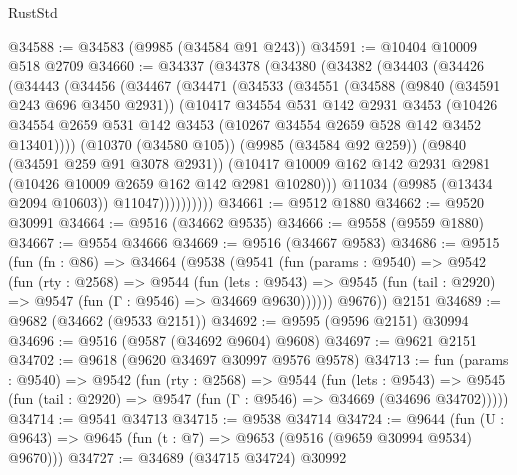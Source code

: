 \begin{lexlean}{RustStd}
\begin{coremodule}
@34588 := @34583 (@9985 (@34584 @91 @243))
@34591 := @10404 @10009 @518 @2709
@34660 := @34337
    (@34378
      (@34380
        (@34382
          (@34403
            (@34426
              (@34443
                (@34456
                  (@34467
                    (@34471
                      (@34533
                        (@34551
                          (@34588
                            (@9840 (@34591 @243 @696 @3450 @2931))
                            (@10417
                              @34554
                              @531
                              @142
                              @2931
                              @3453
                              (@10426
                                @34554
                                @2659
                                @531
                                @142
                                @3453
                                (@10267 @34554 @2659 @528 @142 @3452 @13401))))
                          (@10370 (@34580 @105))
                          (@9985 (@34584 @92 @259))
                          (@9840 (@34591 @259 @91 @3078 @2931))
                          (@10417
                            @10009
                            @162
                            @142
                            @2931
                            @2981
                            (@10426 @10009 @2659 @162 @142 @2981 @10280)))
                        @11034
                        (@9985 (@13434 @2094 @10603))
                        @11047))))))))))
@34661 := @9512 @1880
@34662 := @9520 @30991
@34664 := @9516 (@34662 @9535)
@34666 := @9558 (@9559 @1880)
@34667 := @9554 @34666
@34669 := @9516 (@34667 @9583)
@34686 := @9515
    (fun (fn : @86) =>
    @34664
      (@9538
        (@9541
          (fun (params : @9540) =>
          @9542
            (fun (rty : @2568) =>
            @9544
              (fun (lets : @9543) =>
              @9545 (fun (tail : @2920) => @9547 (fun (Γ : @9546) => @34669 @9630))))))
        @9676))
    @2151
@34689 := @9682 (@34662 (@9533 @2151))
@34692 := @9595 (@9596 @2151) @30994
@34696 := @9516 (@9587 (@34692 @9604) @9608)
@34697 := @9621 @2151
@34702 := @9618 (@9620 @34697 @30997 @9576 @9578)
@34713 := fun (params : @9540) =>
  @9542
    (fun (rty : @2568) =>
    @9544
      (fun (lets : @9543) =>
      @9545 (fun (tail : @2920) => @9547 (fun (Γ : @9546) => @34669 (@34696 @34702)))))
@34714 := @9541 @34713
@34715 := @9538 @34714
@34724 := @9644
    (fun (U : @9643) => @9645 (fun (t : @7) => @9653 (@9516 (@9659 @30994 @9534) @9670)))
@34727 := @34689 (@34715 @34724) @30992

\end{coremodule}
\end{lexlean}
